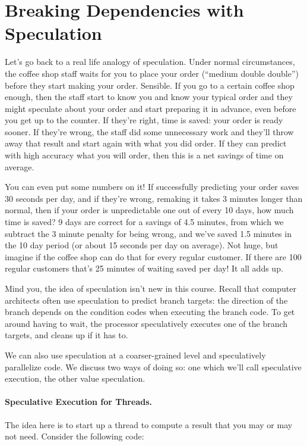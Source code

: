 \section*{Breaking Dependencies with Speculation}
Let's go back to a real life analogy of speculation. Under normal circumstances, the coffee shop staff waits for you to place your order (``medium double double'') before they start making your order. Sensible. If you go to a certain coffee shop enough, then the staff start to know you and know your typical order and they might speculate about your order and start preparing it in advance, even before you get up to the counter. If they're right, time is saved: your order is ready sooner. If they're wrong, the staff did some unnecessary work and they'll throw away that result and start again with what you did order. If they can predict with high accuracy what you will order, then this is a net savings of time on average.

You can even put some numbers on it! If successfully predicting your order saves 30 seconds per day, and if they're wrong, remaking it takes 3 minutes longer than normal, then if your order is unpredictable one out of every 10 days, how much time is saved? 9 days are correct for a savings of 4.5 minutes, from which we subtract the 3 minute penalty for being wrong, and we've saved 1.5 minutes in the 10 day period (or about 15 seconds per day on average). Not huge, but imagine if the coffee shop can do that for every regular customer. If there are 100 regular customers that's 25 minutes of waiting saved per day! It all adds up.

Mind you, the idea of speculation isn't new in this course.
Recall that computer architects often use speculation to predict branch
targets: the direction of the branch depends on the condition codes
when executing the branch code. To get around having to wait, the processor
speculatively executes one of the branch targets, and cleans up if it
has to.

We can also use speculation at a coarser-grained level and
speculatively parallelize code. We discuss two ways of doing so: one
which we'll call speculative execution, the other value speculation.

\paragraph{Speculative Execution for Threads.} The idea here is to
start up a thread to compute a result that you may or may not need.
Consider the following code:

